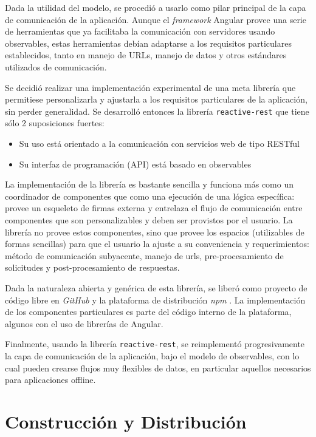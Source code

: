 Dada la utilidad del modelo, se procedió a usarlo como pilar principal de la capa de comunicación de la aplicación. Aunque el \textit{framework} Angular provee una serie de herramientas que ya facilitaba la comunicación con servidores usando observables, estas herramientas debían adaptarse a los requisitos particulares establecidos, tanto en manejo de URLs, manejo de datos y otros estándares utilizados de comunicación.

Se decidió realizar una implementación experimental de una meta librería que permitiese personalizarla y ajustarla a los requisitos particulares de la aplicación, sin perder generalidad. Se desarrolló entonces la librería \texttt{reactive-rest} que tiene sólo 2 suposiciones fuertes:

\begin{itemize}
  \item Su uso está orientado a la comunicación con servicios web de tipo RESTful
  \item Su interfaz de programación (API) está basado en observables
\end{itemize}

La implementación de la librería es bastante sencilla y funciona más como un coordinador de componentes que como una ejecución de una lógica específica: provee un esqueleto de firmas externa y entrelaza el flujo de comunicación entre componentes que son personalizables y deben ser provistos por el usuario. La librería no provee estos componentes, sino que provee los espacios (utilizables de formas sencillas) para que el usuario la ajuste a su conveniencia y requerimientos: método de comunicación subyacente, manejo de urls, pre-procesamiento de solicitudes y post-procesamiento de respuestas.

Dada la naturaleza abierta y genérica de esta librería, se liberó como proyecto de código libre en \textit{GitHub} \cite{reactiverestgithub} y la plataforma de distribución \textit{npm} \cite{reactiverestnpm}. La implementación de los componentes particulares es parte del código interno de la plataforma, algunos con el uso de librerías de Angular.

Finalmente, usando la librería \texttt{reactive-rest}, se reimplementó progresivamente la capa de comunicación de la aplicación, bajo el modelo de observables, con lo cual pueden crearse flujos muy flexibles de datos, en particular aquellos necesarios para aplicaciones offline.

\section{Construcción y Distribución}

